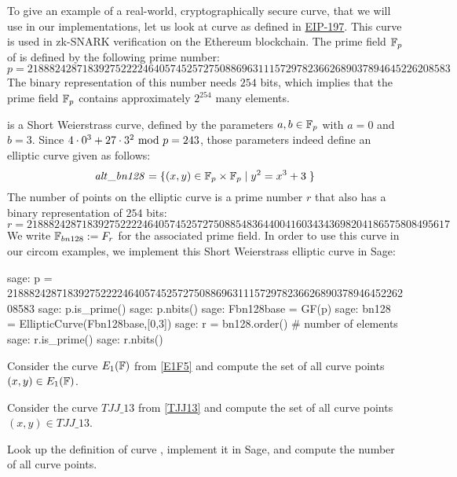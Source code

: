 \begin{example}\label{BN128}
To give an example of a real-world, cryptographically secure curve, that we will use in our  implementations, let us look at curve  as defined in \href{https://github.com/ethereum/EIPs/blob/master/EIPS/eip-197.md}{EIP-197}. This curve is used in zk-SNARK verification on the Ethereum blockchain. The prime field $\mathbb{F}_p$ of  is defined by the following prime number:
$$
p = \scriptstyle 21888242871839275222246405745257275088696311157297823662689037894645226208583
$$
The binary representation of this number needs $254$ bits, which implies that the prime field $\mathbb{F}_p$  contains approximately $2^{254}$ many elements. 

 is a Short Weierstrass curve, defined by the parameters $a,b\in \mathbb{F}_p$ with $a=0$ and $b=3$. Since $4\cdot 0^3 + 27\cdot 3^2 \text{ mod } p=243$, those parameters indeed define an elliptic curve given as follows:
$$
\mathit{alt\_bn128} = \{(x,y)\in \mathbb{F}_p\times \mathbb{F}_p \;|\; y^2 = x^3 +3\;\} 
$$
The number of points on the elliptic curve  is a prime number $r$ that also has a binary representation of $254$ bits:
$$
r = \scriptstyle 21888242871839275222246405745257275088548364400416034343698204186575808495617
$$
We write $\mathbb{F}_{bn128}:=F_r$ for the associated prime field. In order to use this curve in our circom examples, we implement this Short Weierstrass elliptic curve in Sage:
\begin{sagecommandline}
sage: p = 21888242871839275222246405745257275088696311157297823662689037894645226208583
sage: p.is_prime()
sage: p.nbits()
sage: Fbn128base = GF(p)
sage: bn128 = EllipticCurve(Fbn128base,[0,3])
sage: r = bn128.order() # number of elements
sage: r.is_prime()
sage: r.nbits()
\end{sagecommandline}
\end{example}

\begin{exercise} Consider the curve $E_1(\mathbb{F})$ from \examplename{} \ref{E1F5} and compute the set of all curve points $(x,y)\in E_1(\mathbb{F})$.
\end{exercise}
\begin{exercise} Consider the curve $TJJ\_13$ from \examplename{} \ref{TJJ13} and compute the set of all curve points $(x,y)\in TJJ\_13$.
\end{exercise}
\begin{exercise}
Look up the definition of curve , implement it in Sage, and compute the number of all curve points.
\end{exercise}
